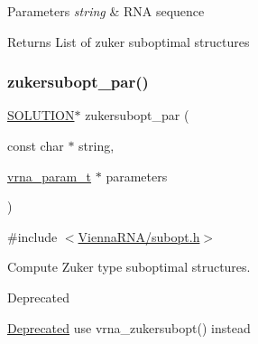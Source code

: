 \begin{DoxyParams}{Parameters}
{\em string} & R\+NA sequence \\
\hline
\end{DoxyParams}
\begin{DoxyReturn}{Returns}
List of zuker suboptimal structures 
\end{DoxyReturn}
\mbox{\label{group__subopt__zuker_gab6d0ea8cc1d02f6dd831ca81043c9eb8}} 
\subsubsection{\texorpdfstring{zukersubopt\+\_\+par()}{zukersubopt\_par()}}
{\footnotesize\ttfamily \hyperlink{subopt_8h_aa0f46ff02e1017469cf902d02ecd7f9a}{S\+O\+L\+U\+T\+I\+ON}$\ast$ zukersubopt\+\_\+par (\begin{DoxyParamCaption}\item[{const char $\ast$}]{string,  }\item[{\hyperlink{group__energy__parameters_ga8a69ca7d787e4fd6079914f5343a1f35}{vrna\+\_\+param\+\_\+t} $\ast$}]{parameters }\end{DoxyParamCaption})}



{\ttfamily \#include $<$\hyperlink{subopt_8h}{Vienna\+R\+N\+A/subopt.\+h}$>$}



Compute Zuker type suboptimal structures. 

\begin{DoxyRefDesc}{Deprecated}
\item[\hyperlink{deprecated__deprecated000134}{Deprecated}]use vrna\+\_\+zukersubopt() instead\end{DoxyRefDesc}
